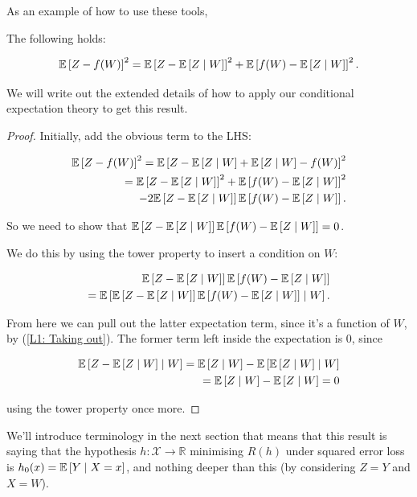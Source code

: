 \documentclass[11pt]{scrartcl}
\begin{document}
As an example of how to use these tools,

\begin{theorem}
\label{best least squares}

The following holds:

\begin{equation}
    \E{Z-f(W)}^2 = \E{Z - \E{Z \mid W}}^2 + \E{f(W)-\E{Z \mid W}}^2.
\end{equation}

We will write out the extended details of how to apply our conditional expectation theory to get this result.

\begin{proof}
Initially, add the obvious term to the LHS:

\begin{align*}
    \E{Z-f(W)}^2 = \E{Z-\E{Z\mid W} + \E{Z\mid W} - f(W)}^2 \\
    = \E{Z - \E{Z \mid W}}^2 + \E{f(W)-\E{Z \mid W}}^2 \\
    - 2 \E{Z - \E{Z\mid W}} \E{f(W)-\E{Z\mid W}}.
\end{align*}

So we need to show that $\E{Z - \E{Z\mid W}} \E{f(W)-\E{Z\mid W}}=0$.

We do this by using the tower property to insert a condition on $W$:

\begin{align*}
    \E{Z - \E{Z\mid W}} \E{f(W)-\E{Z\mid W}} \\
    = \E{ \E{Z - \E{Z\mid W}} \E{f(W)-\E{Z\mid W}} \mid W}.
\end{align*}

From here we can pull out the latter expectation term, since it's a function of $W$, by (\ref{L1: Taking out}). The former term left inside the expectation is 0, since

\begin{align*}
    \E{Z - \E{Z \mid W} \mid W} = \E{Z \mid W} - \E{\E{Z \mid W} \mid W} \\
    = \E{Z \mid W} - \E{Z \mid W} = 0
\end{align*}

using the tower property once more.

\end{proof}
\end{theorem}

We'll introduce terminology in the next section that means that this result is saying that the hypothesis $h:\mathcal{X} \rightarrow \mathbb{R}$ minimising $R(h)$ under squared error loss is $h_0(x)=\E{Y \mid X = x}$, and nothing deeper than this (by considering $Z=Y$ and $X=W$).
\end{document}
